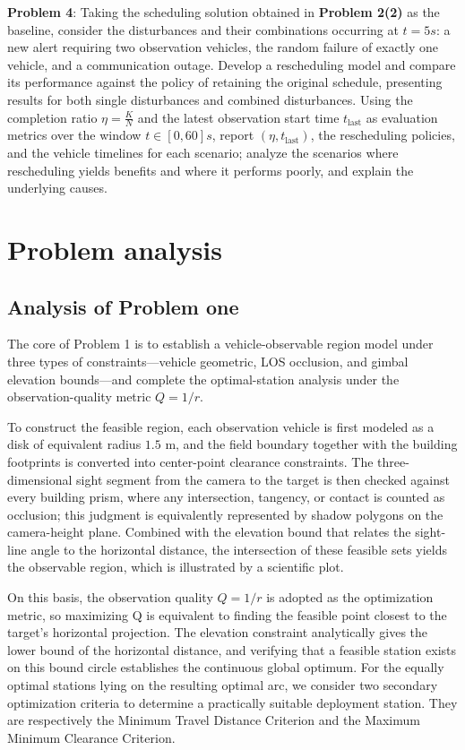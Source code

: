 \documentclass{swmcmthesis}
\begin{document}
\textbf{Problem 4}: Taking the scheduling solution obtained in \textbf{Problem 2(2)} as the baseline, consider the disturbances and their combinations occurring at $t = 5 s$: a new alert requiring two observation vehicles, the random failure of exactly one vehicle, and a communication outage. Develop a rescheduling model and compare its performance against the policy of retaining the original schedule, presenting results for both single disturbances and combined disturbances. Using the completion ratio $\eta = \frac{K}{N}$ and the latest observation start time \(t_{\mathrm{last}}\) as evaluation metrics over the window $t \in [0, 60] s$, report \((\eta,t_{\mathrm{last}})\), the rescheduling policies, and the vehicle timelines for each scenario; analyze the scenarios where rescheduling yields benefits and where it performs poorly, and explain the underlying causes.


\section{Problem analysis}
\subsection{Analysis of Problem one}
The core of Problem 1 is to establish a vehicle-observable region model under three types of constraints—vehicle geometric, LOS occlusion, and gimbal elevation bounds—and complete the optimal-station analysis under the observation-quality metric \(Q=1/r\).

To construct the feasible region, each observation vehicle is first modeled as a disk of equivalent radius \(1.5\) m, and the field boundary together with the building footprints is converted into center-point clearance constraints. The three-dimensional sight segment from the camera to the target is then checked against every building prism, where any intersection, tangency, or contact is counted as occlusion; this judgment is equivalently represented by shadow polygons on the camera-height plane. Combined with the elevation bound that relates the sight-line angle to the horizontal distance, the intersection of these feasible sets yields the observable region, which is illustrated by a scientific plot.

On this basis, the observation quality \(Q=1/r\) is adopted as the optimization metric, so maximizing Q is equivalent to finding the feasible point closest to the target's horizontal projection. The elevation constraint analytically gives the lower bound of the horizontal distance, and verifying that a feasible station exists on this bound circle establishes the continuous global optimum. For the equally optimal stations lying on the resulting optimal arc, we consider two secondary optimization criteria to determine a practically suitable deployment station. They are respectively the Minimum Travel Distance Criterion and the Maximum Minimum Clearance Criterion.
\end{document}
